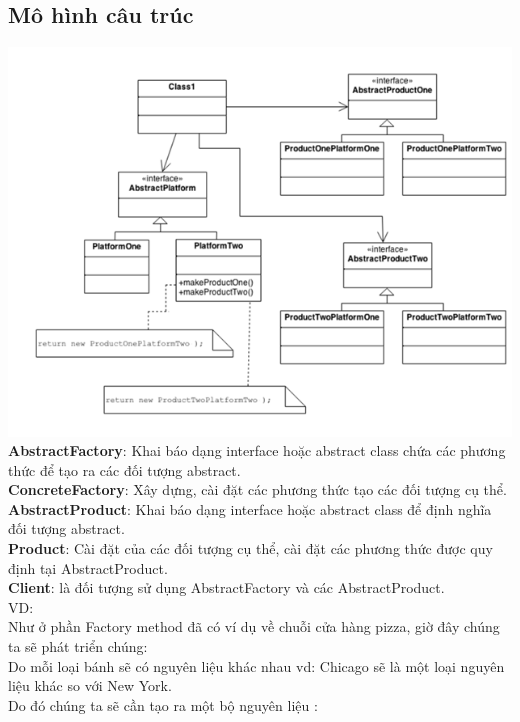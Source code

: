\subsection{Mô hình câu trúc}
\includegraphics{GALLEYS/images/chapter5/diagram2}\\
\textbf{AbstractFactory}: Khai báo dạng interface hoặc abstract class chứa các phương thức để tạo ra các đối tượng abstract.\\
\textbf{ConcreteFactory}: Xây dựng, cài đặt các phương thức tạo các đối tượng cụ thể.\\
\textbf{AbstractProduct}: Khai báo dạng interface hoặc abstract class để định nghĩa đối tượng abstract.\\
\textbf{Product}: Cài đặt của các đối tượng cụ thể, cài đặt các phương thức được quy định tại AbstractProduct.\\
\textbf{Client}: là đối tượng sử dụng AbstractFactory và các AbstractProduct.\\
VD:\\

Như ở phần Factory method đã có ví dụ về chuỗi cửa hàng pizza, giờ đây chúng ta sẽ phát triển chúng:\\

Do mỗi loại bánh sẽ có nguyên liệu khác nhau vd: Chicago sẽ là một loại nguyên liệu khác so với New York.\\

Do đó chúng ta sẽ cần tạo ra một bộ nguyên liệu :\\


